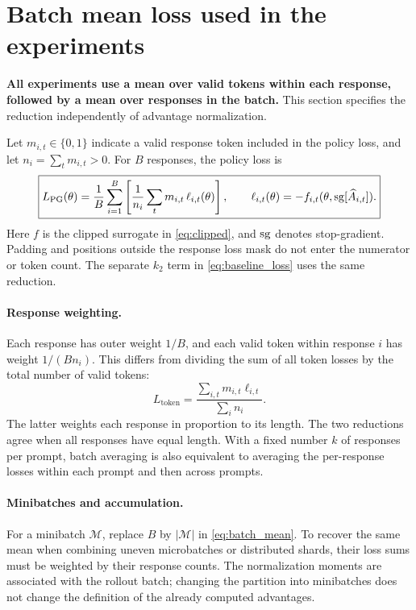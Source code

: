 \section{Batch mean loss used in the experiments}\label{appendix:batch_mean}
\textbf{All experiments use a mean over valid tokens within each response, followed by a mean over responses in the batch.} This section specifies the reduction independently of advantage normalization.

Let $m_{i,t}\in\{0,1\}$ indicate a valid response token included in the policy loss, and let $n_i=\sum_t m_{i,t}>0$. For $B$ responses, the policy loss is
\begin{equation}
 \boxed{
 L_{\mathrm{PG}}(\theta)=\frac{1}{B}\sum_{i=1}^{B}
 \left[\frac{1}{n_i}\sum_t m_{i,t}\,\ell_{i,t}(\theta)\right],
 \qquad
 \ell_{i,t}(\theta)=-f_{i,t}(\theta,\operatorname{sg}[\widehat A_{i,t}]).
 }
 \label{eq:batch_mean}
\end{equation}
Here $f$ is the clipped surrogate in \cref{eq:clipped}, and $\operatorname{sg}$ denotes stop-gradient. Padding and positions outside the response loss mask do not enter the numerator or token count. The separate $k_2$ term in \cref{eq:baseline_loss} uses the same reduction.

\paragraph{Response weighting.}
Each response has outer weight $1/B$, and each valid token within response $i$ has weight $1/(Bn_i)$. This differs from dividing the sum of all token losses by the total number of valid tokens:
\begin{equation}
 L_{\mathrm{token}}=\frac{\sum_{i,t}m_{i,t}\ell_{i,t}}{\sum_i n_i}.
\end{equation}
The latter weights each response in proportion to its length. The two reductions agree when all responses have equal length. With a fixed number $k$ of responses per prompt, batch averaging is also equivalent to averaging the per-response losses within each prompt and then across prompts.

\paragraph{Minibatches and accumulation.}
For a minibatch $\mathcal M$, replace $B$ by $|\mathcal M|$ in \cref{eq:batch_mean}. To recover the same mean when combining uneven microbatches or distributed shards, their loss sums must be weighted by their response counts. The normalization moments are associated with the rollout batch; changing the partition into minibatches does not change the definition of the already computed advantages.


